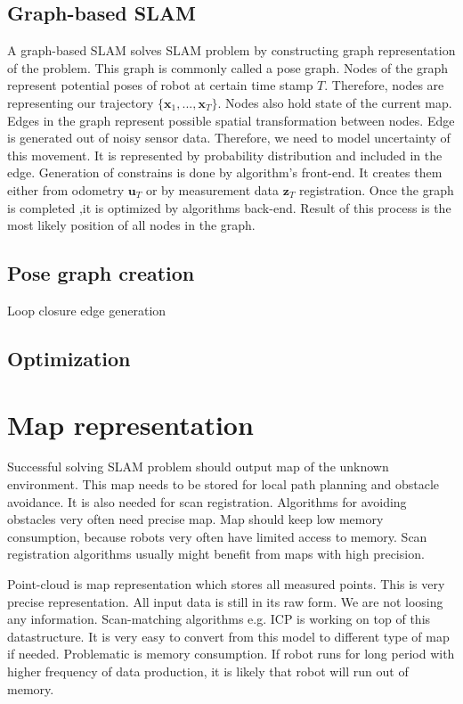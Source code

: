 \subsection{Graph-based SLAM}
A graph-based SLAM solves SLAM problem by constructing graph representation of the problem. This graph is commonly called a pose graph. Nodes of the graph represent potential poses of robot at certain time stamp $ T $. Therefore, nodes are representing our trajectory $ \{\textbf{x}_{1},...,\textbf{x}_{T}\} $. Nodes also hold state of the current map. Edges in the graph represent possible spatial transformation between nodes. Edge is generated out of noisy sensor data. Therefore, we need to model uncertainty of this movement. It is represented by probability distribution and included in the edge. Generation of constrains is done by algorithm's front-end. It creates them either from odometry $  \textbf{u}_{T} $ or by measurement data  $ \textbf{z}_{T} $ registration. Once the graph is completed ,it is optimized by algorithms back-end. Result of this process is the most likely position of all nodes in the graph.

\subsection {Pose graph creation}
\label{Pose_graph_creation}
Loop closure edge generation 
\newpage

\newpage
\subsection{Optimization}
\newpage



\section{Map representation}
\label{MAP_REPRE}
Successful solving SLAM problem should output map of the unknown environment. This map needs to be stored for local path planning and obstacle avoidance. It is also needed for scan registration. Algorithms for avoiding obstacles very often need precise map. Map should keep low memory consumption, because robots very often have limited access to memory. Scan registration algorithms usually might benefit from maps with high precision.

Point-cloud is map representation which stores all measured points. This is very precise representation. All input data is still in its raw form. We are not loosing any information. Scan-matching algorithms e.g. \gls{ICP} is working on top of this datastructure. It is very easy to convert from this model to different type of map if needed. Problematic is memory consumption. If robot runs for long period with higher frequency of data production, it is likely that robot will run out of memory.

